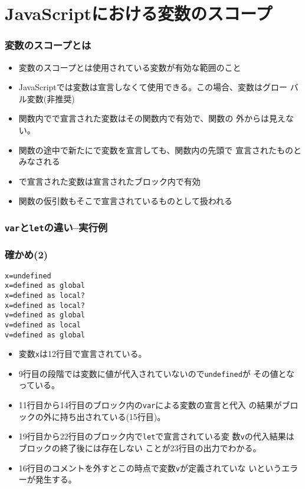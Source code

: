

\frame{\maketitle}
\section{JavaScriptにおける変数のスコープ}
\begin{frame}[containsverbatim]
 \frametitle{変数のスコープとは}
 \begin{itemize}
  \item 変数のスコープとは使用されている変数が有効な範囲のこと
  \item JavaScriptでは変数は宣言しなくて使用できる。この場合、変数はグロー
        バル変数(非推奨)
  \item 関数内でで宣言された変数はその関数内で有効で、関数の
        外からは見えない。
  \item 関数の途中で新たにで変数を宣言しても、関数内の先頭で
        宣言されたものとみなされる
  \item {}で宣言された変数は宣言されたブロック内で有効
  \item 関数の仮引数もそこで宣言されているものとして扱われる
 \end{itemize}
\end{frame}
\begin{frame}[containsverbatim]
 \frametitle{\texttt{var}と\texttt{let}の違い--実行例}
\end{frame}
\begin{frame}[containsverbatim]
 \frametitle{確かめ(2)}
\begin{Verbatim}[fontsize=\small]
x=undefined
x=defined as global
x=defined as local?
x=defined as local?
v=defined as global
v=defined as local
v=defined as global
\end{Verbatim}
\begin{itemize}
 \item 変数\texttt{x}は12行目で宣言されている。
 \item 9行目の段階では変数に値が代入されていないので\texttt{undefined}が
			 その値となっている。
 \item 11行目から14行目のブロック内の\texttt{var}による変数の宣言と代入
			 の結果がブロックの外に持ち出されている(15行目)。
 \item 19行目から22行目のブロック内で\texttt{let}で宣言されている変
			 数\texttt{v}の代入結果はブロックの終了後には存在しない
			 ことが23行目の出力でわかる。
 \item 16行目のコメントを外すとこの時点で変数\texttt{v}が定義されていな
			 いというエラーが発生する。
\end{itemize}
\end{frame}
